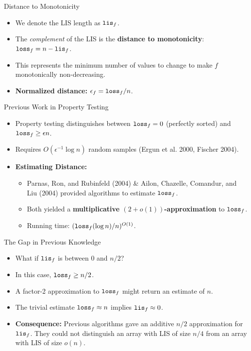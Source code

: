 \documentclass[11pt,aspectratio=169]{beamer}
\newcommand{\lis}{{\tt lis}}
\newcommand{\loss}{{\tt loss}}
\begin{document}
\begin{frame}{Distance to Monotonicity}
    \begin{itemize}
        \item We denote the LIS length as $\lis_f$.
        \item The \emph{complement} of the LIS is the \textbf{distance to monotonicity}: $\loss_f = n - \lis_f$.
        \item This represents the minimum number of values to change to make $f$ monotonically non-decreasing.
        \item \textbf{Normalized distance:} $\epsilon_f = \loss_f / n$.
    \end{itemize}
\end{frame}

\begin{frame}{Previous Work in Property Testing}
    \begin{itemize}
        \item Property testing distinguishes between $\loss_f = 0$ (perfectly sorted) and $\loss_f \geq \epsilon n$.
        \item Requires $O(\epsilon^{-1} \log n)$ random samples (Ergun et al. 2000, Fischer 2004).
        \item \textbf{Estimating Distance:}
        \begin{itemize}
            \item Parnas, Ron, and Rubinfeld (2004) \& Ailon, Chazelle, Comandur, and Liu (2004) provided algorithms to estimate $\loss_f$.
            \item Both yielded a \textbf{multiplicative $(2+o(1))$-approximation} to $\loss_f$.
            \item Running time: $(\loss_f (\log n)/n)^{O(1)}$.
        \end{itemize}
    \end{itemize}
\end{frame}

\begin{frame}{The Gap in Previous Knowledge}
    \begin{itemize}
        \item What if $\lis_f$ is between $0$ and $n/2$?
        \item In this case, $\loss_f \geq n/2$. 
        \item A factor-2 approximation to $\loss_f$ might return an estimate of $n$.
        \item The trivial estimate $\loss_f \approx n$ implies $\lis_f \approx 0$.
        \item \textbf{Consequence:} Previous algorithms gave an additive $n/2$ approximation for $\lis_f$. They could not distinguish an array with LIS of size $n/4$ from an array with LIS of size $o(n)$.
    \end{itemize}
\end{frame}
\end{document}
